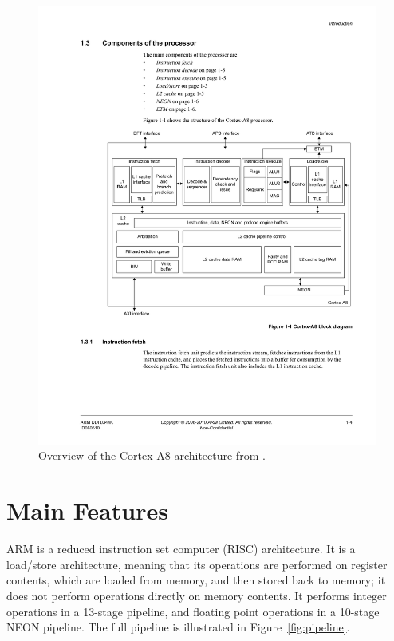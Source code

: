\documentclass[oneside,a4paper]{report}
\begin{document}
\begin{figure}[htbp]
	\centering
	\includegraphics[width=1.0\textwidth]{./fig/CortexA8.pdf}
	\caption{Overview of the Cortex-A8 architecture from \cite[p. 1-4]{A8Ref}.}
	\label{fig:cortexa8}
\end{figure}

\chapter{Main Features}

ARM is a reduced instruction set computer (RISC) architecture. It is a load/store architecture, meaning that its operations are performed on register contents, which are loaded from memory, and then stored back to memory; it does not perform operations directly on memory contents. It performs integer operations in a 13-stage pipeline, and floating point operations in a 10-stage NEON pipeline. The full pipeline is illustrated in Figure~\ref{fig:pipeline}.
\end{document}
